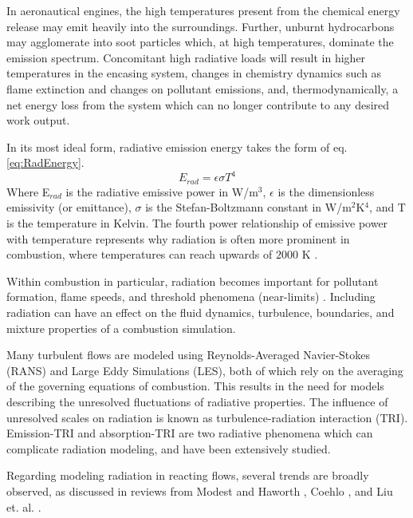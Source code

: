 In aeronautical engines, the high temperatures present from the chemical energy release may emit heavily into the surroundings. Further, unburnt hydrocarbons may agglomerate into soot particles which, at high temperatures, dominate the emission spectrum.
Concomitant high radiative loads will result in higher temperatures in the encasing system, changes in chemistry dynamics such as flame extinction and changes on pollutant emissions, and, thermodynamically, a net energy loss from the system which can no longer contribute to any desired work output.

In its most ideal form, radiative emission energy takes the form of eq. \ref{eq:RadEnergy}.
\begin{equation}
    E_{rad}=\epsilon{}\sigma{}T^4
    \label{eq:RadEnergy}
\end{equation}
Where E$_{rad}$ is the radiative emissive power in W/m$^3$, $\epsilon{}$ is the dimensionless emissivity (or emittance), $\sigma{}$ is the Stefan-Boltzmann constant in W/m$^2$K$^4$, and T is the temperature in Kelvin. 
The fourth power relationship of emissive power with temperature represents why radiation is often more prominent in combustion, where temperatures can reach upwards of $2000$ K \cite{Modest2016RadiativeSystems}.

Within combustion in particular, radiation becomes important for pollutant formation, flame speeds, and threshold phenomena (near-limits) \cite{Modest2016RadiativeSystems,Coelho2018RadiativeSystems,Liu2020TheFlames}. Including radiation can have an effect on the fluid dynamics, turbulence, boundaries, and mixture properties of a combustion simulation.

Many turbulent flows are modeled using Reynolds-Averaged Navier-Stokes (RANS) and Large Eddy Simulations (LES), both of which rely on the averaging of the governing equations of combustion. This results in the need for models describing the unresolved fluctuations of radiative properties. The influence of unresolved scales on radiation is known as turbulence-radiation interaction (TRI). Emission-TRI and absorption-TRI are two radiative phenomena which can complicate radiation modeling, and have been extensively studied.

Regarding modeling radiation in reacting flows, several trends are broadly observed, as discussed in reviews from Modest and Haworth \cite{Modest2016RadiativeSystems}, Coehlo \cite{Coelho2018RadiativeSystems}, and Liu et. al. \cite{Liu2020TheFlames}.

